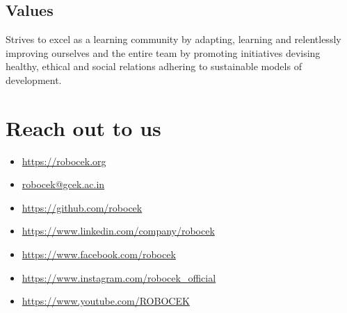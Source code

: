 \subsection{Values}
Strives to excel as a learning community by adapting, learning and relentlessly improving ourselves and the entire team by promoting initiatives devising healthy, ethical and social relations adhering to sustainable models of development.

\section{Reach out to us}
\begin{itemize}
	\item \url{https://robocek.org}
	\item \href{mailto: robocek@gcek.ac.in}{robocek@gcek.ac.in}
	\item \url{https://github.com/robocek}
	\item \url{https://www.linkedin.com/company/robocek}
	\item \url{https://www.facebook.com/robocek}
	\item \url{https://www.instagram.com/robocek\_official}
	\item \url{https://www.youtube.com/ROBOCEK}		
\end{itemize}